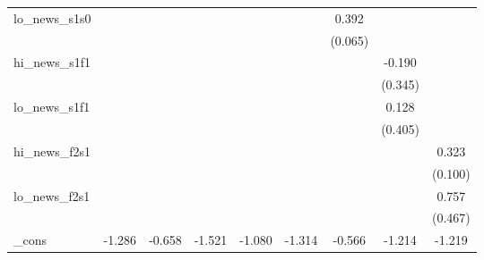 {\begin{tabular}{l*{8}{c}}
\addlinespace
lo\_news\_s1s0&                     &                     &                     &                     &                     &       0.392\sym{***}&                     &                     \\
            &                     &                     &                     &                     &                     &     (0.065)         &                     &                     \\
\addlinespace
hi\_news\_s1f1&                     &                     &                     &                     &                     &                     &      -0.190         &                     \\
            &                     &                     &                     &                     &                     &                     &     (0.345)         &                     \\
\addlinespace
lo\_news\_s1f1&                     &                     &                     &                     &                     &                     &       0.128         &                     \\
            &                     &                     &                     &                     &                     &                     &     (0.405)         &                     \\
\addlinespace
hi\_news\_f2s1&                     &                     &                     &                     &                     &                     &                     &       0.323\sym{***}\\
            &                     &                     &                     &                     &                     &                     &                     &     (0.100)         \\
\addlinespace
lo\_news\_f2s1&                     &                     &                     &                     &                     &                     &                     &       0.757         \\
            &                     &                     &                     &                     &                     &                     &                     &     (0.467)         \\
\addlinespace
\_cons      &      -1.286\sym{**} &      -0.658\sym{**} &      -1.521\sym{***}&      -1.080\sym{*}  &      -1.314\sym{***}&      -0.566\sym{**} &      -1.214\sym{***}&      -1.219\sym{***}\\

\end{tabular}}
